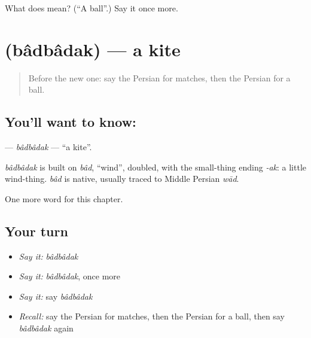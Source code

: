 \begin{tcolorbox}[breakable,colback=teal!4,colframe=teal!35!black,title={Before you move on}]
What does  mean? (\textquotedblleft{}A ball\textquotedblright{}.) Say it once more.
\end{tcolorbox}
\section[\texorpdfstring{\fa{بادبادک} (bâdbâdak)}{بادبادک (bâdbâdak)}]{ (bâdbâdak) — a kite}

\label{lesson:FA-C96-badbadak}



\begin{quote}
Before the new one: say the Persian for matches, then the Persian for a ball.
\end{quote}

\subsection*{You'll want to know: }
\textbf{} — \emph{bâdbâdak} — \textquotedblleft{}a kite\textquotedblright{}.

\begin{cousinweb}
\emph{bâdbâdak} is built on \emph{bâd}, \textquotedblleft{}wind\textquotedblright{}, doubled, with the small-thing ending \emph{-ak}: a little wind-thing. \emph{bâd} is native, usually traced to Middle Persian \emph{wād}.
\end{cousinweb}

\begin{grammarlens}[title={What you've built}]
One more word for this chapter.
\end{grammarlens}

\subsection*{Your turn}
\begin{itemize}
\raggedright
  \item \emph{Say it:} \emph{bâdbâdak}
  \item \emph{Say it:} \emph{bâdbâdak}, once more
  \item \emph{Say it:} say \emph{bâdbâdak}
  \item \emph{Recall:} say the Persian for matches, then the Persian for a ball, then say \emph{bâdbâdak} again
\end{itemize}

